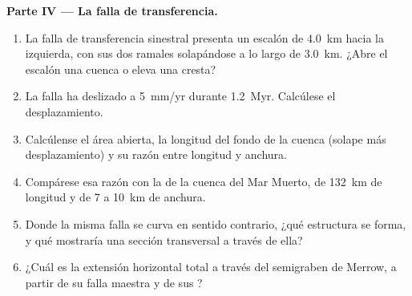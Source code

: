 \begin{problem}
\medskip\noindent\textbf{Parte IV --- La falla de transferencia.}
\begin{enumerate}[resume]
  \item La falla de transferencia sinestral presenta un escalón de \qty{4.0}{km} hacia la izquierda, con sus dos
        ramales solapándose a lo largo de \qty{3.0}{km}. ¿Abre el escalón una cuenca
        o eleva una cresta?
  \item La falla ha deslizado a \qty{5}{mm/yr} durante \qty{1.2}{Myr}. Calcúlese
        el desplazamiento.
  \item Calcúlense el área abierta, la longitud del fondo de la cuenca (solape más
        desplazamiento) y su razón entre longitud y anchura.
  \item Compárese esa razón con la de la cuenca del Mar Muerto, de \qty{132}{km} de longitud y de 7
        a \qty{10}{km} de anchura.
  \item Donde la misma falla se curva en sentido contrario, ¿qué estructura se forma, y
        qué mostraría una sección transversal a través de ella?
  \item ¿Cuál es la extensión horizontal total a través del semigraben de Merrow,
        a partir de su falla maestra y de sus ?
\end{enumerate}
\end{problem}
